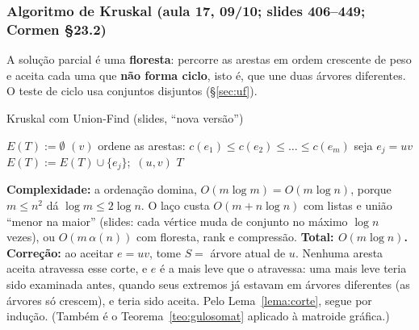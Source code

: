 \subsubsection{Algoritmo de Kruskal (aula 17, 09/10; slides 406--449; Cormen §23.2)}\label{sec:kruskal}
A solução parcial é uma \textbf{floresta}: percorre as arestas em ordem crescente de peso e aceita cada uma que \textbf{não forma ciclo}, isto é, que une duas árvores diferentes. O teste de ciclo usa conjuntos disjuntos (§\ref{sec:uf}).
\begin{pseudo}{Kruskal com Union-Find (slides, ``nova versão'')}
\begin{algorithmic}
  \State $E(T):=\emptyset$
   \State \MakeSet$(v)$  \EndFor
  \State ordene as arestas: $c(e_1)\le c(e_2)\le\dots\le c(e_m)$ 
    \State seja $e_j=uv$
     
      \State $E(T):=E(T)\cup\{e_j\}$;\ \Union$(u,v)$
    \EndIf
  \EndFor
  \State \Return $T$ 
\EndFunction
\end{algorithmic}
\end{pseudo}
\textbf{Complexidade:} a ordenação domina, $O(m\log m)=O(m\log n)$, porque $m\le n^2$ dá $\log m\le2\log n$. O laço custa $O(m+n\log n)$ com listas e união ``menor na maior'' (slides: cada vértice muda de conjunto no máximo $\log n$ vezes), ou $O(m\,\alpha(n))$ com floresta, rank e compressão. \textbf{Total: $O(m\log n)$.}
\textbf{Correção:} ao aceitar $e=uv$, tome $S=$ árvore atual de $u$. Nenhuma aresta aceita atravessa esse corte, e $e$ é a mais leve que o atravessa: uma mais leve teria sido examinada antes, quando seus extremos já estavam em árvores diferentes (as árvores só crescem), e teria sido aceita. Pelo Lema~\ref{lema:corte}, segue por indução. (Também é o Teorema~\ref{teo:gulosomat} aplicado à matroide gráfica.)


